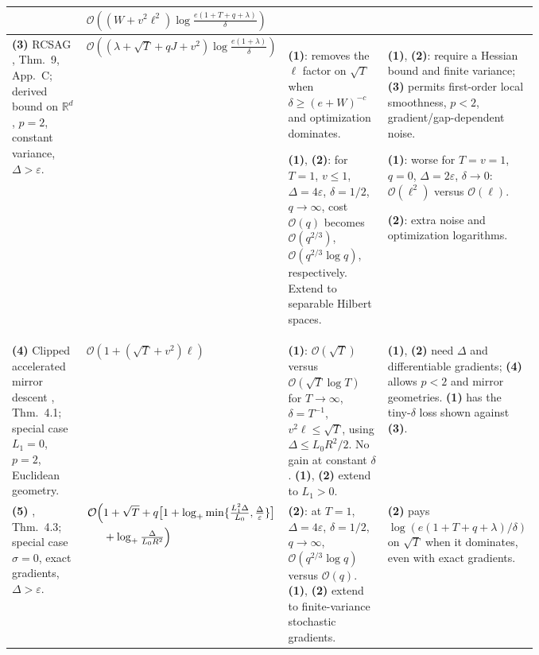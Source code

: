 \begin{table}[tp]
\begin{threeparttable}
\begin{tabularx}{\linewidth}{@{}>{\raggedright\arraybackslash}p{0.20\linewidth}>{\raggedright\arraybackslash}p{0.32\linewidth}>{\raggedright\arraybackslash}p{0.25\linewidth}>{\raggedright\arraybackslash}X@{}}
& $\mathcal{O}\!\left((W+v^2\ell^2)\log\frac{e(1+T+q+\lambda)}{\delta}\right)$ & & \\
\midrule[1.2pt]
\textbf{(3)} RCSAG \citep{fvLobanov2026v1}, Thm.~9, App.~C; derived bound on $\mathbb R^d$, $p=2$, constant variance, $\Delta>\varepsilon$.
& $\mathcal{O}\!\left((\lambda+\sqrt T+qJ+v^2)\log\frac{e(1+\lambda)}{\delta}\right)$
& \textbf{(1)}: removes the $\ell$ factor on $\sqrt T$ when $\delta\ge(e+W)^{-c}$ and optimization dominates.
\par \textbf{(1)}, \textbf{(2)}: for $T=1$, $v\le1$, $\Delta=4\varepsilon$, $\delta=1/2$, $q\to\infty$, cost $\mathcal{O}(q)$ becomes $\mathcal{O}(q^{2/3})$, $\mathcal{O}(q^{2/3}\log q)$, respectively. Extend to separable Hilbert spaces.
& \textbf{(1)}, \textbf{(2)}: require a Hessian bound and finite variance; \textbf{(3)} permits first-order local smoothness, $p<2$, gradient/gap-dependent noise.
\par \textbf{(1)}: worse for $T=v=1$, $q=0$, $\Delta=2\varepsilon$, $\delta\to0$: $\mathcal{O}(\ell^2)$ versus $\mathcal{O}(\ell)$.
\par \textbf{(2)}: extra noise and optimization logarithms. \\
\midrule
\textbf{(4)} Clipped accelerated mirror descent \citep{fvNguyen2023v2}, Thm.~4.1; special case $L_1=0$, $p=2$, Euclidean geometry.
& $\mathcal{O}\!\left(1+(\sqrt T+v^2)\ell\right)$
& \textbf{(1)}: $\mathcal{O}(\sqrt T)$ versus $\mathcal{O}(\sqrt T\log T)$ for $T\to\infty$, $\delta=T^{-1}$, $v^2\ell\le\sqrt T$, using $\Delta\le L_0R^2/2$. No gain at constant $\delta$. \textbf{(1)}, \textbf{(2)} extend to $L_1>0$.
& \textbf{(1)}, \textbf{(2)} need $\Delta$ and differentiable gradients; \textbf{(4)} allows $p<2$ and mirror geometries. \textbf{(1)} has the tiny-$\delta$ loss shown against \textbf{(3)}. \\
\midrule
\textbf{(5)} \citep{fvTyurin2026v2}, Thm.~4.3; special case $\sigma=0$, exact gradients, $\Delta>\varepsilon$.
& $\begin{aligned}[t]\mathcal{O}\Bigl(&1+\sqrt T+q\bigl[1+\log_+\min\{\tfrac{L_1^2\Delta}{L_0},\tfrac{\Delta}{\varepsilon}\}\bigr]\\
&+\log_+\tfrac{\Delta}{L_0R^2}\Bigr)\end{aligned}$
& \textbf{(2)}: at $T=1$, $\Delta=4\varepsilon$, $\delta=1/2$, $q\to\infty$, $\mathcal{O}(q^{2/3}\log q)$ versus $\mathcal{O}(q)$. \textbf{(1)}, \textbf{(2)} extend to finite-variance stochastic gradients.
& \textbf{(2)} pays $\log(e(1+T+q+\lambda)/\delta)$ on $\sqrt T$ when it dominates, even with exact gradients. \\

\end{tabularx}
\end{threeparttable}
\end{table}
